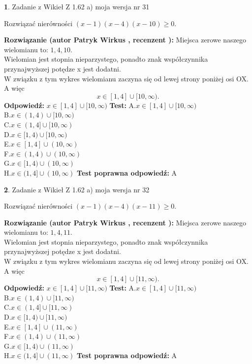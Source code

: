 \documentclass[12pt, a4paper]{article}
\theoremstyle{definition} %
\newtheorem{zad}{}
\newcommand{\zadStart}[1]{\begin{zad}#1\newline}
\newcommand{\zadStop}{\end{zad}}
\newcommand{\rozwStart}[2]{\noindent \textbf{Rozwiązanie (autor #1 , recenzent #2): }\newline}
\newcommand{\rozwStop}{\newline}
\newcommand{\odpStart}{\noindent \textbf{Odpowiedź:}\newline}
\newcommand{\odpStop}{\newline}
\newcommand{\testStart}{\noindent \textbf{Test:}\newline}
\newcommand{\testStop}{\newline}
\newcommand{\kluczStart}{\noindent \textbf{Test poprawna odpowiedź:}\newline}
\newcommand{\kluczStop}{\newline}
\begin{document}
\zadStart{Zadanie z Wikieł Z 1.62 a) moja wersja nr 31}

Rozwiązać nierówności $(x-1)(x-4)(x-10)\ge0$.
\zadStop
\rozwStart{Patryk Wirkus}{}
Miejsca zerowe naszego wielomianu to: $1, 4, 10$.\\
Wielomian jest stopnia nieparzystego, ponadto znak współczynnika przy\linebreak najwyższej potędze x jest dodatni.\\ W związku z tym wykres wielomianu zaczyna się od lewej strony poniżej osi OX. A więc $$x \in [1,4] \cup [10,\infty).$$
\rozwStop
\odpStart
$x \in [1,4] \cup [10,\infty)$
\odpStop
\testStart
A.$x \in [1,4] \cup [10,\infty)$\\
B.$x \in (1,4) \cup [10,\infty)$\\
C.$x \in (1,4] \cup [10,\infty)$\\
D.$x \in [1,4) \cup [10,\infty)$\\
E.$x \in [1,4] \cup (10,\infty)$\\
F.$x \in (1,4) \cup (10,\infty)$\\
G.$x \in [1,4) \cup (10,\infty)$\\
H.$x \in (1,4] \cup (10,\infty)$
\testStop
\kluczStart
A
\kluczStop



\zadStart{Zadanie z Wikieł Z 1.62 a) moja wersja nr 32}

Rozwiązać nierówności $(x-1)(x-4)(x-11)\ge0$.
\zadStop
\rozwStart{Patryk Wirkus}{}
Miejsca zerowe naszego wielomianu to: $1, 4, 11$.\\
Wielomian jest stopnia nieparzystego, ponadto znak współczynnika przy\linebreak najwyższej potędze x jest dodatni.\\ W związku z tym wykres wielomianu zaczyna się od lewej strony poniżej osi OX. A więc $$x \in [1,4] \cup [11,\infty).$$
\rozwStop
\odpStart
$x \in [1,4] \cup [11,\infty)$
\odpStop
\testStart
A.$x \in [1,4] \cup [11,\infty)$\\
B.$x \in (1,4) \cup [11,\infty)$\\
C.$x \in (1,4] \cup [11,\infty)$\\
D.$x \in [1,4) \cup [11,\infty)$\\
E.$x \in [1,4] \cup (11,\infty)$\\
F.$x \in (1,4) \cup (11,\infty)$\\
G.$x \in [1,4) \cup (11,\infty)$\\
H.$x \in (1,4] \cup (11,\infty)$
\testStop
\kluczStart
A
\kluczStop
\end{document}
